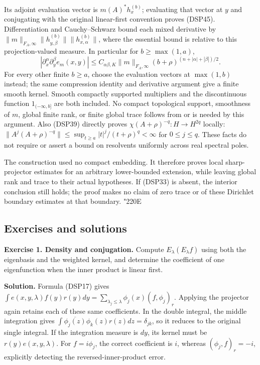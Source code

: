 \documentclass[
  11pt,
]{article}
\makeatletter
\let\ReaderOriginalAnchorStart\hyper@anchorstart
\let\ReaderOriginalAnchorEnd\hyper@anchorend
\let\ReaderPendingAliases\@empty
\def\ReaderArmAliases#1{\gdef\ReaderPendingAliases{#1}}
\def\hyper@anchorstart#1{\ReaderIfNativeAnchorTF{#1}{\ReaderPendingAliases\global\let\ReaderPendingAliases\@empty}{}\ReaderOriginalAnchorStart{#1}}
\makeatother
\begin{document}
Its adjoint evaluation vector is \(m(A)^*h_x^{(b)}\); evaluating that
vector at \(y\) and conjugating with the original linear-first
convention proves (DSP45). Differentiation and Cauchy--Schwarz bound
each mixed derivative by
\(\|m\|_{F_A,\infty}\|h_{y,\beta}^{(b)}\|\|h_{x,\alpha}^{(b)}\|\), where
the essential bound is relative to this projection-valued measure. In
particular for \(b\geq\max(1,a)\), \[
 |\partial_x^\alpha\partial_y^\beta e_m(x,y)|
 \leq C_{\alpha\beta,K}\|m\|_{F_A,\infty}
                (b+\rho)^{(n+|\alpha|+|\beta|)/2}.
 \tag{DSP45b}
\] For every other finite \(b\geq a\), choose the evaluation vectors at
\(\max(1,b)\) instead; the same compression identity and derivative
argument give a finite smooth kernel. Smooth compactly supported
multipliers and the discontinuous function \(1_{(-\infty,b]}\) are both
included. No compact topological support, smoothness of \(m\), global
finite rank, or finite global trace follows from or is needed by this
argument. Also (DSP39) directly proves \(\chi(A+\rho)^{-q}:H\to H^{2q}\)
locally:
\(\|A^j(A+\rho)^{-q}\|\leq\sup_{t\geq a}|t|^j/(t+\rho)^q<\infty\) for
\(0\leq j\leq q\). These facts do not require or assert a bound on
resolvents uniformly across real spectral poles.

The construction used no compact embedding. It therefore proves local
sharp-projector estimates for an arbitrary lower-bounded extension,
while leaving global rank and trace to their actual hypotheses. If
(DSP33) is absent, the interior conclusion still holds; the proof makes
no claim of zero trace or of these Dirichlet boundary estimates at that
boundary. {\ReaderSymbols\char"220E}

\ReaderArmAliases{\ReaderOriginalAnchorStart{exercises-and-fully-written-solutions}\ReaderOriginalAnchorEnd\begingroup\expandafter\def\csname @currentHref\endcsname{exercises-and-fully-written-solutions}\label{exercises-and-fully-written-solutions}\endgroup\ReaderOriginalAnchorStart{exercises-and-solutions}\ReaderOriginalAnchorEnd}
\subsection{Exercises and solutions}\label{exercises-and-solutions}

\textbf{Exercise 1. Density and conjugation.} Compute
\(E_\lambda(E_\lambda f)\) using both the eigenbasis and the weighted
kernel, and determine the coefficient of one eigenfunction when the
inner product is linear first.

\textbf{Solution.} Formula (DSP17) gives
\(\int e(x,y,\lambda)f(y)r(y)dy=\sum_{\lambda_j\leq\lambda}\phi_j(x)(f,\phi_j)_r\).
Applying the projector again retains each of these same coefficients. In
the double integral, the middle integration gives
\(\int\overline{\phi_j(z)}\phi_k(z)r(z)dz=\delta_{jk}\), so it reduces
to the original single integral. If the integration measure is \(dy\),
its kernel must be \(r(y)e(x,y,\lambda)\). For \(f=i\phi_j\), the
correct coefficient is \(i\), whereas \((\phi_j,f)_r=-i\), explicitly
detecting the reversed-inner-product error.
\end{document}
